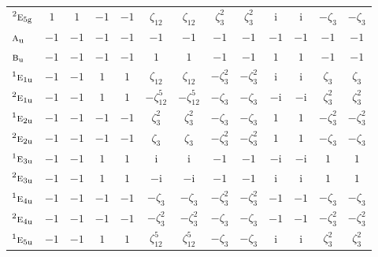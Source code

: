 \documentclass[10pt,a4paper]{article}
\numberwithin{equation}{section}
\newcommand{\irr}[1]{\text{\normalfont\scshape #1}}
\newcommand{\conjpair}[1]{{}^{#1}}
\newcommand{\ptag}[1]{\mathrm{#1}}
\newcommand{\iunit}{\mathrm{i}}
\newcommand{\rootunity}[1]{\zeta_{#1}}
\begin{document}
{\begin{longtable}{@{}lcccccccccccc@{}}
$\conjpair{2}\irr{e}_{5\ptag{g}}$ & $1$ & $1$ & $-1$ & $-1$ & $\rootunity{12}$ & $\rootunity{12}$ & $\rootunity{3}^{2}$ & $\rootunity{3}^{2}$ & $\iunit{}$ & $\iunit{}$ & $-\rootunity{3}$ & $-\rootunity{3}$\\
$\irr{a}_{\ptag{u}}$ & $-1$ & $-1$ & $-1$ & $-1$ & $-1$ & $-1$ & $-1$ & $-1$ & $-1$ & $-1$ & $-1$ & $-1$\\
$\irr{b}_{\ptag{u}}$ & $-1$ & $-1$ & $-1$ & $-1$ & $1$ & $1$ & $-1$ & $-1$ & $1$ & $1$ & $-1$ & $-1$\\
$\conjpair{1}\irr{e}_{1\ptag{u}}$ & $-1$ & $-1$ & $1$ & $1$ & $\rootunity{12}$ & $\rootunity{12}$ & $-\rootunity{3}^{2}$ & $-\rootunity{3}^{2}$ & $\iunit{}$ & $\iunit{}$ & $\rootunity{3}$ & $\rootunity{3}$\\
$\conjpair{2}\irr{e}_{1\ptag{u}}$ & $-1$ & $-1$ & $1$ & $1$ & $-\rootunity{12}^{5}$ & $-\rootunity{12}^{5}$ & $-\rootunity{3}$ & $-\rootunity{3}$ & $-\iunit{}$ & $-\iunit{}$ & $\rootunity{3}^{2}$ & $\rootunity{3}^{2}$\\
$\conjpair{1}\irr{e}_{2\ptag{u}}$ & $-1$ & $-1$ & $-1$ & $-1$ & $\rootunity{3}^{2}$ & $\rootunity{3}^{2}$ & $-\rootunity{3}$ & $-\rootunity{3}$ & $1$ & $1$ & $-\rootunity{3}^{2}$ & $-\rootunity{3}^{2}$\\
$\conjpair{2}\irr{e}_{2\ptag{u}}$ & $-1$ & $-1$ & $-1$ & $-1$ & $\rootunity{3}$ & $\rootunity{3}$ & $-\rootunity{3}^{2}$ & $-\rootunity{3}^{2}$ & $1$ & $1$ & $-\rootunity{3}$ & $-\rootunity{3}$\\
$\conjpair{1}\irr{e}_{3\ptag{u}}$ & $-1$ & $-1$ & $1$ & $1$ & $\iunit{}$ & $\iunit{}$ & $-1$ & $-1$ & $-\iunit{}$ & $-\iunit{}$ & $1$ & $1$\\
$\conjpair{2}\irr{e}_{3\ptag{u}}$ & $-1$ & $-1$ & $1$ & $1$ & $-\iunit{}$ & $-\iunit{}$ & $-1$ & $-1$ & $\iunit{}$ & $\iunit{}$ & $1$ & $1$\\
$\conjpair{1}\irr{e}_{4\ptag{u}}$ & $-1$ & $-1$ & $-1$ & $-1$ & $-\rootunity{3}$ & $-\rootunity{3}$ & $-\rootunity{3}^{2}$ & $-\rootunity{3}^{2}$ & $-1$ & $-1$ & $-\rootunity{3}$ & $-\rootunity{3}$\\
$\conjpair{2}\irr{e}_{4\ptag{u}}$ & $-1$ & $-1$ & $-1$ & $-1$ & $-\rootunity{3}^{2}$ & $-\rootunity{3}^{2}$ & $-\rootunity{3}$ & $-\rootunity{3}$ & $-1$ & $-1$ & $-\rootunity{3}^{2}$ & $-\rootunity{3}^{2}$\\
$\conjpair{1}\irr{e}_{5\ptag{u}}$ & $-1$ & $-1$ & $1$ & $1$ & $\rootunity{12}^{5}$ & $\rootunity{12}^{5}$ & $-\rootunity{3}$ & $-\rootunity{3}$ & $\iunit{}$ & $\iunit{}$ & $\rootunity{3}^{2}$ & $\rootunity{3}^{2}$\\

\end{longtable}}
\end{document}
